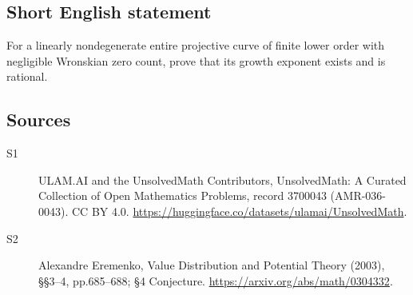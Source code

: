 \documentclass[11pt]{article}
\begin{document}
\subsection{Short English statement}
For a linearly nondegenerate entire projective curve of finite lower order with negligible Wronskian zero count, prove that its growth exponent exists and is rational.
\subsection{Sources}
\begin{description}
\item[\hypertarget{source:3700043:1}{S1}] ULAM.AI and the UnsolvedMath Contributors, UnsolvedMath: A Curated Collection of Open Mathematics Problems, record 3700043 (AMR-036-0043). CC BY 4.0. \url{https://huggingface.co/datasets/ulamai/UnsolvedMath}.
\item[\hypertarget{source:3700043:2}{S2}] Alexandre Eremenko, Value Distribution and Potential Theory (2003), §§3–4, pp.685–688; §4 Conjecture. \url{https://arxiv.org/abs/math/0304332}.
\end{description}
\label{end:3700043}
\end{document}
